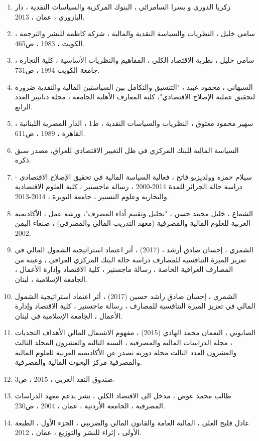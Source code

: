 \documentclass[10pt,a4paper]{report}
\begin{document}
\begin{enumerate}
	www.uabonline.org/ar/.../financialinclusiontowardsstrategi../downl.pdf.
	\item زكريا الدوري و يسرا السامرائي ، البنوك المركزية والسياسات النقدية ، دار اليازوري ، عمان ، 2013.
	\item سامي خليل ، النظريات والسياسة النقدية والمالية ، شركة كاظمة للنشر والترجمة ، الكويت ، 1983 ، ص465.
	\item سامي خليل ، نظرية الاقتصاد الكلي ، المفاهيم والنظريات الأساسية ، كلية التجارة ، جامعة الكويت 1994 ، ص731.
	\item السبهاني ، محمود عبيد ، "التنسيق والتكامل بين السياستين المالية والنقدية ضرورة لتحقيق عملية الإصلاح الاقتصادي"، كلية المعارف الأهلية الجامعة ، مجلة دنانيير العدد الرابع.
	\item سهير محمود معتوق ، النظريات والسياسات النقدية ، ط1 ، الدار المصرية اللبنانية ، القاهرة ، 1989 ، ص611.
	\item السياسة المالية للبنك المركزي في ظل التغيير الاقتصادي للعراق، مصدر سبق ذكره.
	\item سيلام حمزة وولديزيو فاتح ، فعالية السياسة المالية في تحقيق الإصلاح الاقتصادي - دراسة حالة الجزائر للمدة 2014-2000 ، رسالة ماجستير ، كلية العلوم الاقتصادية والتجارية وعلوم التسيير ، جامعة البويرة ، 2014-2013.
	\item الشماع ، خليل محمد حسن ، "تحليل وتقييم أداء المصرف"، ورشة عمل ، الأكاديمية العربية للعلوم المالية والمصرفية (معهد التدريب المالي والمصرفي) ، صنعاء اليمن 2002.
	\item الشمري ، إحسان صادق أرشد ، (2017) ، أثر اعتماد استراتيجية الشمول المالي في تعزيز الميزة التنافسية للمصارف دراسة حالة البنك المركزي العراقي ، وعينة من المصارف العراقية الخاصة ، رسالة ماجستير ، كلية الاقتصاد وإدارة الأعمال ، الجامعة الإسلامية ، لبنان.
	\item الشمري ، إحسان صادق راشد حسين (2017) ، أثر اعتماد استراتيجية الشمول المالي في تعزيز الميزة التنافسية للمصارف ، رسالة ماجستير ، كلية الاقتصاد وإدارة الأعمال ، الجامعة الإسلامية في لبنان.
	\item الصابوني ، النعمان محمد الهادي (2015) ، مفهوم الاشتمال المالي الأهداف التحديات ، مجلة الدراسات المالية والمصرفية ، السنة الثالثة والعشرون المجلد الثالث والعشرون العدد الثالث مجلة دورية تصدر عن الأكاديمية العربية للعلوم المالية والمصرفية مركز البحوث المالية والمصرفية.
	\item صندوق النقد العربي ، 2015 ، ص3.
	\item طالب محمد عوض ، مدخل الى الاقتصاد الكلي ، نشر بدعم معهد الدراسات المصرفية ، الجامعة الأردنية ، عمان ، 2004 ، ص230.
	\item عادل فليح العلي ، المالية العامة والقانون المالي والضريبي ، الجزء الأول ، الطبعة الأولى ، إثراء للنشر والتوزيع ، عمان ، 2012.

\end{enumerate}
\end{document}
